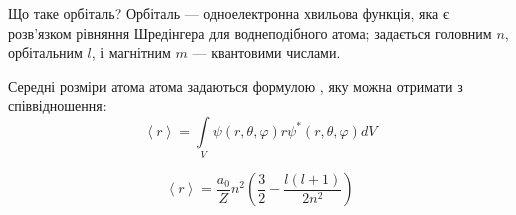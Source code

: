 \documentclass[]{beamer}
\begin{document}
\begin{frame}{Що таке орбіталь?}
	Орбіталь --- одноелектронна хвильова функція, яка є розв'язком рівняння Шредінгера для воднеподібного атома; задається  головним $n$, орбітальним $l$, і магнітним $m$ --- квантовими числами.

Середні розміри атома атома задаються формулою
, яку можна отримати з співвідношення:
\begin{equation*}
	\left\langle r\right\rangle =  \int\limits_{V} \psi(r,\theta,\varphi) r \psi^*(r, \theta, \varphi) dV
\end{equation*}

\begin{equation*}
	\left\langle r \right\rangle = \frac{a_0}{Z}n^2 \left( \frac32 - \frac{l(l+1)}{2n^2}\right)
\end{equation*}


\end{frame}
\end{document}
